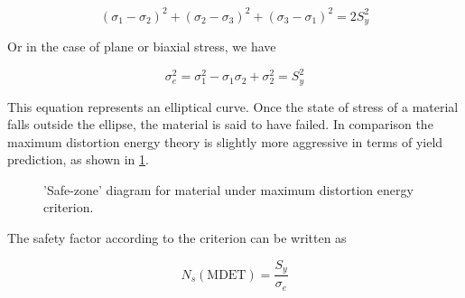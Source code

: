 \documentclass[
10pt,
a4paper,
openany,
svgnames,
]{book}
\begin{document}
\begin{equation}
  (\sigma_1 - \sigma_2)^2 + (\sigma_2 - \sigma_3)^2 + (\sigma_3 - \sigma_1)^2 = 2S_y^2
\end{equation}

Or in the case of plane or biaxial stress, we have

\begin{equation}
  \label{eqn: equiv stress for MDET}
  \sigma_e^2 = \sigma_1^2 - \sigma_1\sigma_2 + \sigma_2^2 = S_y^2
\end{equation}

This equation represents an elliptical curve. Once the state of stress of a material falls outside the ellipse, the material is said to have failed.
In comparison the maximum distortion energy theory is slightly more aggressive in terms of yield prediction, as shown in \cref{fig: MDET safe zone}.

\begin{figure}[h]
  \centering
  \caption{'Safe-zone' diagram for material under maximum distortion energy criterion.}
  \label{fig: MDET safe zone}
\end{figure}

The safety factor according to the criterion can be written as

\begin{equation}
  \label{eqn: design eqn for MDET}
  N_s(\text{MDET}) = \frac{S_y}{\sigma_e}
\end{equation}
\end{document}
